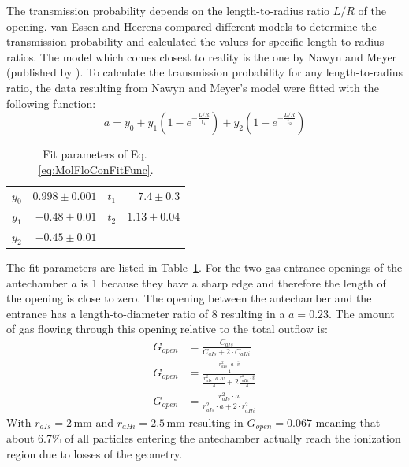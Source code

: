 	The transmission probability depends on the length-to-radius ratio $L/R$ of the opening. van Essen and Heerens \cite{molFlowTubeTransm_Essen1976} compared different models to determine the transmission probability and calculated the values for specific length-to-radius ratios. The model which comes closest to reality is the one by Nawyn and Meyer (published by \cite{molFlowTubeTransm_Essen1976}). To calculate the transmission probability for any length-to-radius ratio, the data resulting from Nawyn and Meyer's model were fitted with the following function:
	\begin{equation}
		a = y_0 + y_1\left(1-e^{-\frac{L/R}{t_1}}\right) + y_2\left(1-e^{-\frac{L/R}{t_2}}\right)
		\label{eq:MolFloConFitFunc}
	\end{equation}
	
	\begin{table}[H]
		\begin{center}
			\begin{tabular}{|l r| l r|}
				\hline
				$y_0$	& $0.998 \pm 0.001$ & $t_1$	& $7.4 \pm 0.3$	\\
				$y_1$	& $-0.48 \pm 0.01$ & $t_2$	& $1.13 \pm 0.04$ \\
				$y_2$ 	& $-0.45 \pm 0.01$	& &\\
				\hline
			\end{tabular}
		\end{center}
		\caption{Fit parameters of Eq.\,\eqref{eq:MolFloConFitFunc}.}
		\label{tab:thMolFloConFiPara}
	\end{table}
The fit parameters are listed in Table~\ref{tab:thMolFloConFiPara}.
For the two gas entrance openings of the antechamber $a$ is 1 because they have a sharp edge and therefore the length of the opening is close to zero. 
The opening between the antechamber and the entrance has a length-to-diameter ratio of 8 resulting in a $a = 0.23$. 
The amount of gas flowing through this opening relative to the total outflow is:
	\begin{align}
		G_{open} & = \frac{C_{aIs}}{C_{aIs} + 2\cdot C_{aHi}} \label{eq:GAntOpen}\\
		G_{open} & = \frac{\frac{r_{aIs}^2\cdot a\cdot \bar{v}}{4}}{\frac{r_{aIs}^2\cdot a\cdot \bar{v}}{4} + 2\frac{r_{aHi}^2\cdot \bar{v}}{4}}\\
		G_{open} &= \frac{r_{aIs}^2\cdot a}{r_{aIs}^2\cdot a + 2\cdot r_{aHi}^2}
		\label{eq:geoOpenTube}
	\end{align}
	With $r_{aIs} = 2\,\si{\milli\meter}$ and $r_{aHi} = 2.5\,\si{\milli\meter}$ resulting in $G_{open} = 0.067$ meaning that about 6.7\% of all particles entering the antechamber actually reach the ionization region due to losses of the geometry.\\
